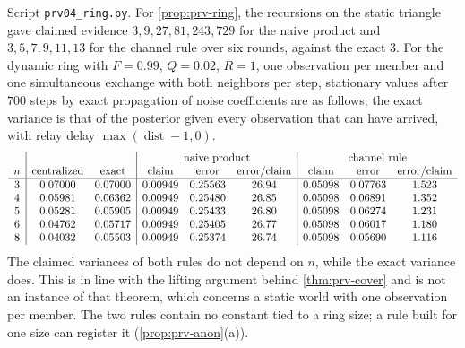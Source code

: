\begin{numcheck}\label{chk:prv-ring}
Script \texttt{prv04\_ring.py}. For \cref{prop:prv-ring}, the recursions on the static triangle gave claimed evidence $3,9,27,81,243,729$ for the naive product and $3,5,7,9,11,13$ for the channel rule over six rounds, against the exact $3$. For the dynamic ring with $F=0.99$, $Q=0.02$, $R=1$, one observation per member and one simultaneous exchange with both neighbors per step, stationary values after $700$ steps by exact propagation of noise coefficients are as follows; the exact variance is that of the posterior given every observation that can have arrived, with relay delay $\max(\operatorname{dist}-1,0)$.
\[
\begin{array}{c|cc|ccc|ccc}
 & & & \multicolumn{3}{c|}{\text{naive product}} & \multicolumn{3}{c}{\text{channel rule}}\\
n & \text{centralized} & \text{exact} & \text{claim} & \text{error} & \text{error/claim} & \text{claim} & \text{error} & \text{error/claim}\\\hline
3 & 0.07000 & 0.07000 & 0.00949 & 0.25563 & 26.94 & 0.05098 & 0.07763 & 1.523\\
4 & 0.05981 & 0.06362 & 0.00949 & 0.25480 & 26.85 & 0.05098 & 0.06891 & 1.352\\
5 & 0.05281 & 0.05905 & 0.00949 & 0.25433 & 26.80 & 0.05098 & 0.06274 & 1.231\\
6 & 0.04762 & 0.05717 & 0.00949 & 0.25405 & 26.77 & 0.05098 & 0.06017 & 1.180\\
8 & 0.04032 & 0.05503 & 0.00949 & 0.25374 & 26.74 & 0.05098 & 0.05690 & 1.116
\end{array}
\]
The claimed variances of both rules do not depend on $n$, while the exact variance does. This is in line with the lifting argument behind \cref{thm:prv-cover} and is not an instance of that theorem, which concerns a static world with one observation per member. The two rules contain no constant tied to a ring size; a rule built for one size can register it (\cref{prop:prv-anon}(a)).
\end{numcheck}

